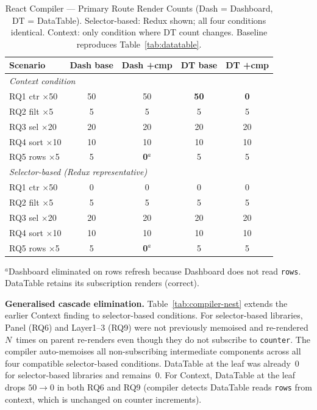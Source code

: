 \documentclass[conference]{IEEEtran}
\newcommand{\code}[1]{\texttt{\small #1}}
\begin{document}
\begin{table}[!ht]
\caption{React Compiler --- Primary Route Render Counts
  (Dash = Dashboard, DT = DataTable).
  Selector-based: Redux shown; all four conditions identical.
  Context: only condition where DT count changes.
  Baseline reproduces Table~\ref{tab:datatable}.}
\label{tab:compiler-prim}
\begin{center}
\small
\setlength{\tabcolsep}{3pt}
\begin{tabular}{lcccc}
\toprule
\textbf{Scenario}
  & \textbf{Dash base} & \textbf{Dash +cmp}
  & \textbf{DT base}   & \textbf{DT +cmp} \\
\midrule
\multicolumn{5}{l}{\textit{Context condition}} \\
RQ1 ctr $\times$50   & 50 & 50              & \textbf{50} & \textbf{0} \\
RQ2 filt $\times$5   & 5  & 5               & 5  & 5  \\
RQ3 sel $\times$20   & 20 & 20              & 20 & 20 \\
RQ4 sort $\times$10  & 10 & 10              & 10 & 10 \\
RQ5 rows $\times$5   & 5  & \textbf{0}$^a$  & 5  & 5  \\
\midrule
\multicolumn{5}{l}{\textit{Selector-based (Redux representative)}} \\
RQ1 ctr $\times$50   & 0  & 0               & 0  & 0  \\
RQ2 filt $\times$5   & 5  & 5               & 5  & 5  \\
RQ3 sel $\times$20   & 20 & 20              & 20 & 20 \\
RQ4 sort $\times$10  & 10 & 10              & 10 & 10 \\
RQ5 rows $\times$5   & 5  & \textbf{0}$^a$  & 5  & 5  \\
\bottomrule
\end{tabular}
\end{center}
\parbox{\columnwidth}{\scriptsize
$^a$Dashboard eliminated on rows refresh because Dashboard does not
read \code{rows}.  DataTable retains its subscription renders (correct).}
\end{table}

\textbf{Generalised cascade elimination.}
Table~\ref{tab:compiler-nest} extends the earlier Context finding to
selector-based conditions.  For selector-based libraries, Panel (RQ6)
and Layer1--3 (RQ9) were not previously memoised and re-rendered
$N$~times on parent re-renders even though they do not subscribe to
\code{counter}.  The compiler auto-memoises all non-subscribing
intermediate components across all four compatible selector-based
conditions.  DataTable at the leaf was already~0 for selector-based
libraries and remains~0.  For Context, DataTable at the leaf drops
$50{\to}0$ in both RQ6 and RQ9 (compiler detects DataTable reads
\code{rows} from context, which is unchanged on counter increments).
\end{document}
